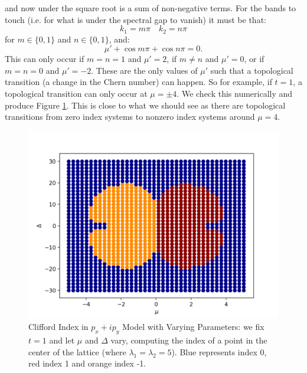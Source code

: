 \documentclass[a4paper]{article}
\begin{document}
and now under the square root is a sum of non-negative terms. For the bands to touch (i.e. for what is under the spectral gap to vanish) it must be that:
\begin{equation}
	k_1 = m \pi \quad k_2 = n \pi
\end{equation}
for $m \in \{0,1\}$ and $n \in \{0,1\}$, and:
\begin{equation}
	\mu' + \cos m \pi + \cos n \pi = 0.
\end{equation}
This can only occur if $m = n = 1$ and $\mu' = 2$, if $m \neq n$ and $\mu' = 0$, or if $m = n = 0$ and $\mu' = - 2$.
These are the only values of $\mu'$ such that a topological transition (a change in the Chern number) can happen.
So for example, if $t = 1$, a topological transition can only occur at $\mu = \pm4$.
We check this numerically and produce Figure \ref{fig:pxipy_params}.
This is close to what we should see as there are topological transitions from zero index systems to nonzero index systems around $\mu = 4$.

\begin{figure}
\centering
\includegraphics[width=.9\textwidth]{figures/pxipy_index_by_param.png}
\caption{Clifford Index in $p_x + ip_y$ Model with Varying Parameters: we fix $t = 1$ and let $\mu$ and $\Delta$ vary, computing the index of a point in the center of the lattice (where $\lambda_1 = \lambda_2 = 5$).
Blue represents index 0, red index 1 and orange index -1.
}
\label{fig:pxipy_params}%
\end{figure}
\end{document}
